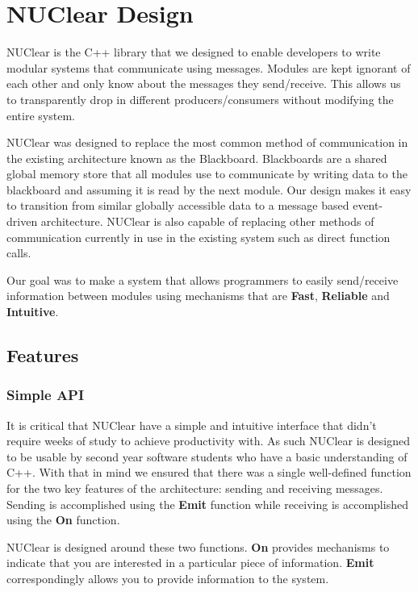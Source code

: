 \documentclass[english,12pt]{scrartcl}
\begin{document}
		
	\section{NUClear Design}
		NUClear is the C++ library that we designed to enable developers to write modular systems that communicate using messages. 
		Modules are kept ignorant of each other and only know about the messages they send/receive. 
		This allows us to transparently drop in different producers/consumers without modifying the entire system.
		
		NUClear was designed to replace the most common method of communication in the existing architecture known as the Blackboard.
		Blackboards are a shared global memory store that all modules use to communicate by writing data to the blackboard and assuming it is read by the next module.
		Our design makes it easy to transition from similar globally accessible data to a message based event-driven architecture.
		NUClear is also capable of replacing other methods of communication currently in use in the existing system such as direct function calls.
		
		Our goal was to make a system that allows programmers to easily send/receive information between modules using mechanisms that are \textbf{Fast}, \textbf{Reliable} and \textbf{Intuitive}.

		\subsection{Features}
			\subsubsection{Simple API}
				It is critical that NUClear have a simple and intuitive interface that didn't require weeks of study to achieve productivity with.
				As such NUClear is designed to be usable by second year software students who have a basic understanding of C++. 
				With that in mind we ensured that there was a single well-defined function for the two key features of the architecture: sending and receiving messages. Sending is accomplished using the \textbf{Emit} function while receiving is accomplished using the \textbf{On} function.
				
				NUClear is designed around these two functions. \textbf{On} provides mechanisms to indicate that you are interested in a particular piece of information.
				\textbf{Emit} correspondingly allows you to provide information to the system.
				
\end{document}
